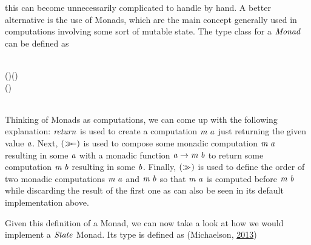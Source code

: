 \documentclass[paper=A4,twoside=true,openright,parskip=full,chapterprefix=true,headings=normal,bibliography=totoc,listof=totoc,titlepage=on,captions=tableabove,draft=false,british]{scrreprt}%
\begin{document}
this can become unnecessarily complicated to handle by hand. A better
alternative is the use of Monads, which are the main concept generally
used in computations involving some sort of mutable state. The type
class for a \ensuremath{\Conid{Monad}} can be defined as


\begin{hscode}\SaveRestoreHook
{}%
%
%
\>[B]{}\;\;\;\<[E]%
\\
\>[B]{}\<[5]%
\>[5]{}(\bind )\mathbin{::}\;\to (\to {}\;)\to {}\;\<[E]%
\\
\>[B]{}\<[5]%
\>[5]{}(\sequ )\mathbin{::}\;\to {}\;\to {}\;\<[E]%
\\
\>[B]{}\<[5]%
\>[5]{}\sequ {}\mathrel{=}\bind {}\to {}\<[E]%
\\
\>[B]{}\<[5]%
\>[5]{}\mathbin{::}\to {}\;\<[E]%
\ColumnHook
\end{hscode}\resethooks
\vspace{-2\baselineskip}

Thinking of Monads as computations, we can come up with the following
explanation: \ensuremath{\Varid{return}} is used to create a computation \ensuremath{\Varid{m}\;\Varid{a}} just
returning the given value \ensuremath{\Varid{a}}. Next, \ensuremath{(\bind )} is used to compose some
monadic computation \ensuremath{\Varid{m}\;\Varid{a}} resulting in some \ensuremath{\Varid{a}} with a monadic function
\ensuremath{\Varid{a}\to \Varid{m}\;\Varid{b}} to return some computation \ensuremath{\Varid{m}\;\Varid{b}} resulting in some \ensuremath{\Varid{b}}.
Finally, \ensuremath{(\sequ )} is used to define the order of two monadic computations
\ensuremath{\Varid{m}\;\Varid{a}} and \ensuremath{\Varid{m}\;\Varid{b}} so that \ensuremath{\Varid{m}\;\Varid{a}} is computed before \ensuremath{\Varid{m}\;\Varid{b}} while discarding
the result of the first one as can also be seen in its default
implementation above.

Given this definition of a Monad, we can now take a look at how we would
implement a \ensuremath{\Conid{State}} Monad. Its type is defined as (Michaelson,
\protect\hyperlink{ref-learnyouahaskell}{2013})
\end{document}
